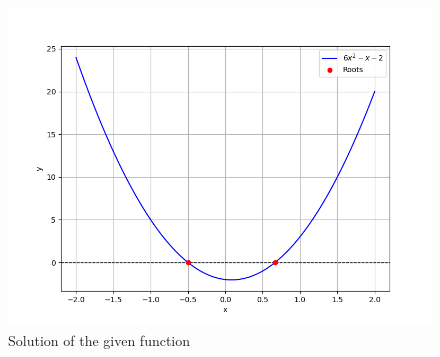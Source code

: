 \documentclass[journal]{IEEEtran}
\begin{document}
\begin{figure}[!ht]
		\centering
		\includegraphics[width=\columnwidth]{figs/Figure_2.png}
		\caption{Solution of the given function}
		\label{stemplot}
	\end{figure}
\end{document}
